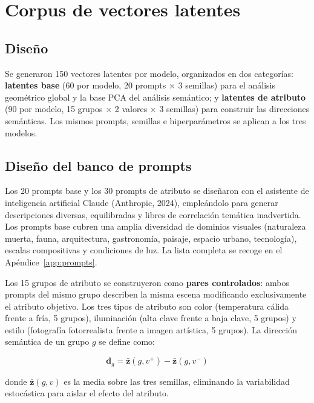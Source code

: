 \documentclass[12pt, a4paper, twoside]{book}
\newcommand{\z}{\mathbf{z}}
\begin{document}
\section{Corpus de vectores latentes}
\label{sec:corpus}

\subsection{Diseño}

Se generaron 150 vectores latentes por modelo, organizados en dos categorías: \textbf{latentes base} (60 por modelo, 20 prompts $\times$ 3 semillas) para el análisis geométrico global y la base PCA del análisis semántico; y \textbf{latentes de atributo} (90 por modelo, 15 grupos $\times$ 2 valores $\times$ 3 semillas) para construir las direcciones semánticas. Los mismos prompts, semillas e hiperparámetros se aplican a los tres modelos.

\subsection{Diseño del banco de prompts}

Los 20 prompts base y los 30 prompts de atributo se diseñaron con el asistente de inteligencia artificial Claude (Anthropic, 2024), empleándolo para generar descripciones diversas, equilibradas y libres de correlación temática inadvertida. Los prompts base cubren una amplia diversidad de dominios visuales (naturaleza muerta, fauna, arquitectura, gastronomía, paisaje, espacio urbano, tecnología), escalas compositivas y condiciones de luz. La lista completa se recoge en el Apéndice~\ref{app:prompts}.

Los 15 grupos de atributo se construyeron como \textbf{pares controlados}: ambos prompts del mismo grupo describen la misma escena modificando exclusivamente el atributo objetivo. Los tres tipos de atributo son color (temperatura cálida frente a fría, 5 grupos), iluminación (alta clave frente a baja clave, 5 grupos) y estilo (fotografía fotorrealista frente a imagen artística, 5 grupos). La dirección semántica de un grupo $g$ se define como:

\begin{equation}
\mathbf{d}_g = \bar{\z}(g, v^+) - \bar{\z}(g, v^-)
\label{eq:dir_semantica}
\end{equation}

donde $\bar{\z}(g, v)$ es la media sobre las tres semillas, eliminando la variabilidad estocástica para aislar el efecto del atributo.
\end{document}
